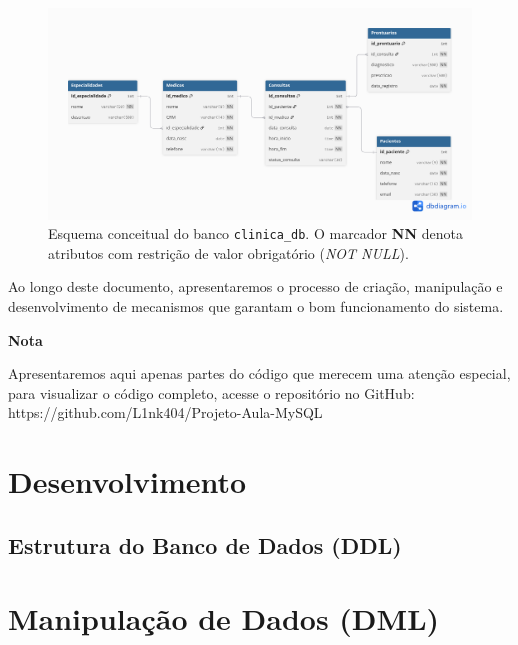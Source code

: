 \documentclass[a4paper,12pt]{article}
\begin{document}
\begin{figure}[H]
    \centering
    \includegraphics[width=1\linewidth]{db_conceitual.png}
    \caption{Esquema conceitual do banco \texttt{clinica\_db}. O marcador \textbf{NN} denota atributos com restrição de valor obrigatório (\textit{NOT NULL}).}
    \label{fig:conceitual}
\end{figure}

Ao longo deste documento, apresentaremos o processo de criação, manipulação e desenvolvimento de mecanismos que garantam o bom funcionamento do sistema.

\begin{alertbox}
\begin{center}
\textbf{Nota}    
\end{center}
Apresentaremos aqui apenas partes do código que merecem uma atenção especial, para visualizar o código completo, acesse o repositório no GitHub: https://github.com/L1nk404/Projeto-Aula-MySQL
\end{alertbox}

\newpage
\section{Desenvolvimento}
\subsection{Estrutura do Banco de Dados (DDL)}


\newpage
\section{Manipulação de Dados (DML)}

\end{document}
